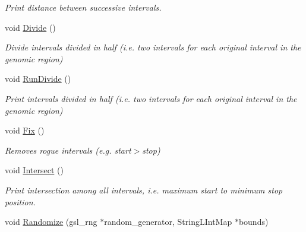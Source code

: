 \begin{DoxyCompactItemize}
\begin{DoxyCompactList}\small\item\em Print distance between successive intervals. \end{DoxyCompactList}\item 
\hypertarget{classGenomicRegionSAM_a7c16ba87be562950021d3f19eb14ac5e}{
void \hyperlink{classGenomicRegionSAM_a7c16ba87be562950021d3f19eb14ac5e}{Divide} ()}
\label{classGenomicRegionSAM_a7c16ba87be562950021d3f19eb14ac5e}

\begin{DoxyCompactList}\small\item\em Divide intervals divided in half (i.e. two intervals for each original interval in the genomic region) \end{DoxyCompactList}\item 
\hypertarget{classGenomicRegionSAM_add2ada73e241f593dcdcdfca97df1eb5}{
void \hyperlink{classGenomicRegionSAM_add2ada73e241f593dcdcdfca97df1eb5}{RunDivide} ()}
\label{classGenomicRegionSAM_add2ada73e241f593dcdcdfca97df1eb5}

\begin{DoxyCompactList}\small\item\em Print intervals divided in half (i.e. two intervals for each original interval in the genomic region) \end{DoxyCompactList}\item 
\hypertarget{classGenomicRegionSAM_ad955a6a512678613b4a42d2db0d3f549}{
void \hyperlink{classGenomicRegionSAM_ad955a6a512678613b4a42d2db0d3f549}{Fix} ()}
\label{classGenomicRegionSAM_ad955a6a512678613b4a42d2db0d3f549}

\begin{DoxyCompactList}\small\item\em Removes rogue intervals (e.g. start$>$stop) \end{DoxyCompactList}\item 
\hypertarget{classGenomicRegionSAM_a4f26b01325ebd4e20c9bf3247d5fa733}{
void \hyperlink{classGenomicRegionSAM_a4f26b01325ebd4e20c9bf3247d5fa733}{Intersect} ()}
\label{classGenomicRegionSAM_a4f26b01325ebd4e20c9bf3247d5fa733}

\begin{DoxyCompactList}\small\item\em Print intersection among all intervals, i.e. maximum start to minimum stop position. \end{DoxyCompactList}\item 
\hypertarget{classGenomicRegionSAM_a538b8fc9969f24da6911ec39c8d70a3b}{
void \hyperlink{classGenomicRegionSAM_a538b8fc9969f24da6911ec39c8d70a3b}{Randomize} (gsl\_\-rng $\ast$random\_\-generator, StringLIntMap $\ast$bounds)}
\label{classGenomicRegionSAM_a538b8fc9969f24da6911ec39c8d70a3b}


\end{DoxyCompactItemize}
